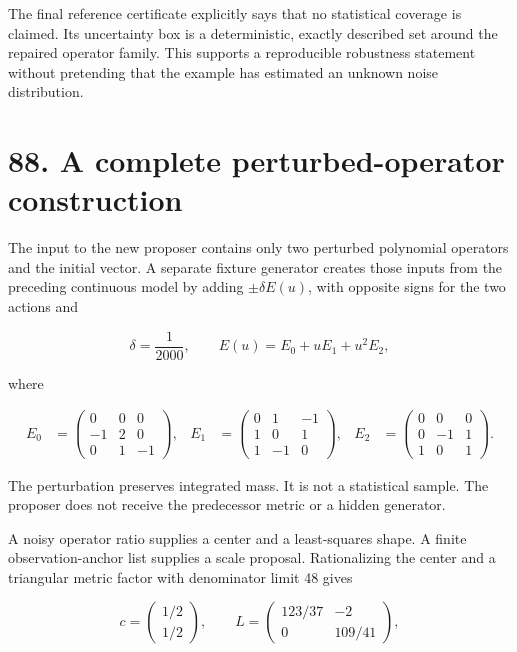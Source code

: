 \documentclass[11pt,letterpaper]{article}
\begin{document}
The final reference certificate explicitly says that no statistical
coverage is claimed. Its uncertainty box is a deterministic, exactly
described set around the repaired operator family. This supports a
reproducible robustness statement without pretending that the example
has estimated an unknown noise distribution.

\section{88. A complete perturbed-operator
construction}\label{a-complete-perturbed-operator-construction}

The input to the new proposer contains only two perturbed polynomial
operators and the initial vector. A separate fixture generator creates
those inputs from the preceding continuous model by adding
\(\pm\delta E(u)\), with opposite signs for the two actions and

\[
\delta=\frac1{2000},\qquad
E(u)=E_0+uE_1+u^2E_2,
\]

where

\[
\begin{aligned}
E_0&=\begin{pmatrix}0&0&0\\-1&2&0\\0&1&-1\end{pmatrix},&
E_1&=\begin{pmatrix}0&1&-1\\1&0&1\\1&-1&0\end{pmatrix},&
E_2&=\begin{pmatrix}0&0&0\\0&-1&1\\1&0&1\end{pmatrix}.
\end{aligned}
\]

The perturbation preserves integrated mass. It is not a statistical
sample. The proposer does not receive the predecessor metric or a hidden
generator.

A noisy operator ratio supplies a center and a least-squares shape. A
finite observation-anchor list supplies a scale proposal. Rationalizing
the center and a triangular metric factor with denominator limit 48
gives

\[
c=\begin{pmatrix}1/2\\1/2\end{pmatrix},\qquad
L=\begin{pmatrix}123/37&-2\\0&109/41\end{pmatrix},
\]
\end{document}
